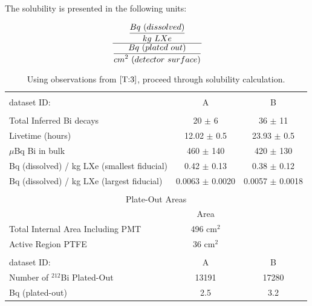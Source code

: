 The solubility is presented in the following units:

\begin{equation*}
\centering
$$
\frac{\displaystyle  \frac{\displaystyle Bq~(dissolved)}{\displaystyle kg~LXe} }{\displaystyle  \frac{\displaystyle Bq~(plated~out)}{\displaystyle cm^{2}~(detector~surface)} }
$$
\end{equation*}



\begin{table}[ht]
\centering
\caption{Using observations from $\ref{T:3}$, proceed through solubility calculation.}
\begin{tabular}{lcc}
\hline
\\[-5pt]
dataset ID: & A &B \\
\hline
\\[-5pt]
Total Inferred Bi decays & 20 $\pm$ 6 & 36 $\pm$ 11 \\
Livetime (hours) & 12.02 $\pm$ 0.5 & 23.93 $\pm$ 0.5 \\
$\mu$Bq Bi in bulk & 460 $\pm$ 140 &  420 $\pm$ 130 \\
Bq (dissolved) / kg LXe (smallest fiducial) & 0.42 $\pm$ 0.13 & 0.38 $\pm$ 0.12 \\
Bq (dissolved) / kg LXe (largest fiducial) & 0.0063 $\pm$ 0.0020  &  0.0057 $\pm$ 0.0018\\
\hline \\
\multicolumn{3}{c}{Plate-Out Areas} \\
\hline
 & Area \\
Total Internal Area Including PMT & 496 cm$^{2}$ \\ %
Active Region PTFE & 36 cm$^{2}$ \\ %
\hline \\
dataset ID: & A &B \\
Number of $^{212}$Bi Plated-Out & 13191  & 17280 \\
Bq (plated-out) & 2.5  & 3.2 \\

\end{tabular}
\end{table}
